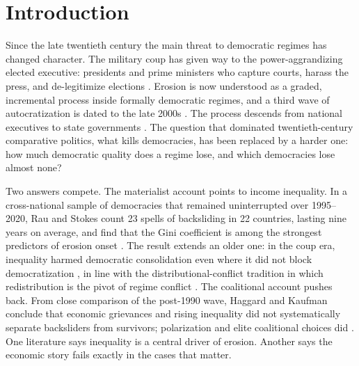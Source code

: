 \section{Introduction}

Since the late twentieth century the main threat to democratic regimes has changed character. The military coup has given way to the power-aggrandizing elected executive: presidents and prime ministers who capture courts, harass the press, and de-legitimize elections \citep{RauStokes2025, WaldnerLust2018, Bermeo2016, LevitskyZiblatt2018}. Erosion is now understood as a graded, incremental process inside formally democratic regimes, and a third wave of autocratization is dated to the late 2000s \citep{LuhrmannLindberg2019}. The process descends from national executives to state governments \citep{Grumbach2023}. The question that dominated twentieth-century comparative politics, what kills democracies, has been replaced by a harder one: how much democratic quality does a regime lose, and which democracies lose almost none?

Two answers compete. The materialist account points to income inequality. In a cross-national sample of democracies that remained uninterrupted over 1995--2020, Rau and Stokes count 23 spells of backsliding in 22 countries, lasting nine years on average, and find that the Gini coefficient is among the strongest predictors of erosion onset \citep{RauStokes2025}. The result extends an older one: in the coup era, inequality harmed democratic consolidation even where it did not block democratization \citep{Houle2009}, in line with the distributional-conflict tradition in which redistribution is the pivot of regime conflict \citep{AcemogluRobinson2006, Boix2003, AnsellSamuels2014}. The coalitional account pushes back. From close comparison of the post-1990 wave, Haggard and Kaufman conclude that economic grievances and rising inequality did not systematically separate backsliders from survivors; polarization and elite coalitional choices did \citep{HaggardKaufman2021, Svolik2019}. One literature says inequality is a central driver of erosion. Another says the economic story fails exactly in the cases that matter.

